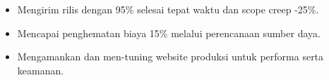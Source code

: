 \begin{itemize}
\item Mengirim rilis dengan 95\% selesai tepat waktu dan scope creep -25\%.
\item Mencapai penghematan biaya 15\% melalui perencanaan sumber daya.
\end{itemize}
\divider

\begin{itemize}
\item Mengamankan dan men-tuning website produksi untuk performa serta keamanan.
\end{itemize}

\newpage
\switchcolumn
